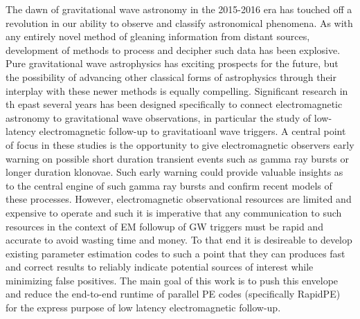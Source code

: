 The dawn of gravitational wave astronomy in the 2015-2016 era has touched off a revolution in our ability to observe and classify astronomical phenomena. As with any entirely novel method of gleaning information from distant sources, development of methods to process and decipher such data has been explosive. Pure gravitational wave astrophysics has exciting prospects for the future, but the possibility of advancing other classical forms of astrophysics through their interplay with these newer methods is equally compelling. Significant research \cite{first2years} in th epast several years has been designed specifically to connect electromagnetic astronomy to gravitational wave observations, in particular the study of low-latency electromagnetic follow-up to gravitatioanl wave triggers. A central point of focus in these studies is the opportunity to give electromagnetic observers early warning on possible short duration transient events such as gamma ray bursts or longer duration klonovae. Such early warning could provide valuable insights as to the central engine of such gamma ray bursts and confirm recent models of these processes. However, electromagnetic observational resources are limited and expensive to operate and such it is imperative that any communication to such resources in the context of EM followup of GW triggers must be rapid and accurate to avoid wasting time and money. To that end it is desireable to develop existing parameter estimation codes to such a point that they can produces fast and correct results to reliably indicate potential sources of interest while minimizing false positives. The main goal of this work is to push this envelope and reduce the end-to-end runtime of parallel PE codes (specifically RapidPE) for the express purpose of low latency electromagnetic follow-up.


